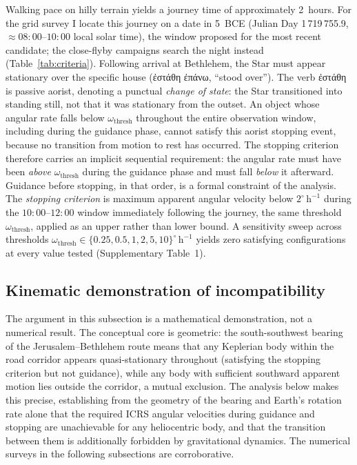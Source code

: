 \documentclass[sn-nature]{sn-jnl}
\newcommand{\grk}[1]{{\fontencoding{LGR}\selectfont #1}}
\newcommand{\grk}[1]{{\greekfont #1}}
\begin{document}
Walking pace on hilly terrain yields a journey time of approximately 2~hours.
For the grid survey I locate this journey on a date in 5~BCE (Julian Day
1\,719\,755.9, $\approx\!08{:}00$--$10{:}00$ local solar time), the window
proposed for the most recent candidate\cite{matney2025jbaa}; the close-flyby
campaigns search the night instead (Table~\ref{tab:criteria}). Following
arrival at Bethlehem, the Star must appear stationary over the specific house
(\grk{ἐστάθη ἐπάνω}, ``stood over'').
The verb \grk{ἐστάθη} is passive aorist, denoting a punctual \emph{change of state}:
the Star transitioned into standing still, not that it was stationary from the outset.
An object whose angular rate falls below $\omega_\mathrm{thresh}$ throughout the entire
observation window, including during the guidance phase, cannot satisfy this aorist
stopping event, because no transition from motion to rest has occurred.
The stopping criterion therefore carries an implicit sequential requirement:
the angular rate must have been \emph{above} $\omega_\mathrm{thresh}$ during the
guidance phase and must fall \emph{below} it afterward.
Guidance before stopping, in that order, is a formal constraint of the analysis.
The \textit{stopping criterion} is maximum apparent angular velocity below
$2^\circ\,\mathrm{h}^{-1}$ during the $10{:}00$--$12{:}00$ window immediately
following the journey, the same threshold $\omega_\mathrm{thresh}$, applied as
an upper rather than lower bound. A sensitivity sweep across thresholds
$\omega_\mathrm{thresh} \in \{0.25, 0.5, 1, 2, 5, 10\}^\circ\,\mathrm{h}^{-1}$
yields zero satisfying configurations at every value tested (Supplementary
Table~1).

\subsection{Kinematic demonstration of incompatibility}\label{subsec:kinematic}

The argument in this subsection is a mathematical demonstration, not a numerical
result. The conceptual core is geometric: the south-southwest bearing of the
Jerusalem--Bethlehem route means that any Keplerian body within the road
corridor appears quasi-stationary throughout (satisfying the stopping criterion
but not guidance), while any body with sufficient southward apparent motion
lies outside the corridor, a mutual exclusion. The analysis below makes this
precise, establishing from the geometry of the bearing and Earth's rotation
rate alone that the required ICRS angular velocities during guidance and
stopping are unachievable for any heliocentric body, and that the transition
between them is additionally forbidden by gravitational dynamics. The numerical
surveys in the following subsections are corroborative.
\end{document}
